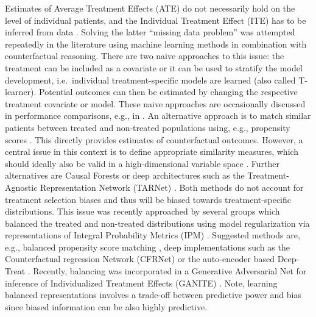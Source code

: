 \documentclass{article}
\begin{document}
	Estimates of Average Treatment Effects (ATE) do not necessarily hold on the level of individual patients, and the Individual Treatment Effect (ITE) has to be inferred from data \cite{Holland.1986}. Solving the latter ``missing data problem'' was attempted repeatedly in the literature using machine learning methods in combination with counterfactual reasoning. There are two naive approaches to this issue: the treatment can be included as a covariate or it can be used to stratify the model development, i.e.~individual treatment-specific models are learned (also called T-learner). Potential outcomes can then be estimated by changing the respective treatment covariate or model. %
	These naive approaches are occasionally discussed in performance comparisons, e.g., in \cite{Chapfuwa.2020,Curth.2021}. An alternative approach is to match similar patients between treated and non-treated populations using, e.g., propensity scores \cite{Rosenbaum.1983}. This directly provides estimates of counterfactual outcomes. However, a central issue in this context is to define appropriate similarity measures, which should ideally also be valid in a high-dimensional variable space \cite{King.2019}. Further alternatives are Causal Forests \cite{Athey.2016,Wager.2017,Athey.2019} or deep architectures such as the Treatment-Agnostic Representation Network (TARNet) \cite{Johansson.2016,Shalit.2016}. Both methods do not account for treatment selection biases and thus will be biased towards treatment-specific distributions. This issue was recently approached by several groups which balanced
	the treated and non-treated distributions using model regularization via representations of Integral Probability Metrics (IPM) \cite{Muller.1991}. Suggested methods are, e.g., balanced propensity score matching \cite{Diamond.2013,Li.2017}, deep implementations such as the Counterfactual regression Network (CFRNet) \cite{Johansson.2016,Shalit.2016} or the auto-encoder based Deep-Treat \cite{Atan.2018}. Recently, balancing was incorporated in a Generative Adversarial Net for inference of Individualized Treatment Effects (GANITE) \cite{Yoon.2018}. Note, learning balanced representations involves a trade-off between predictive power and bias since biased information can be also highly predictive.  
	
\end{document}
